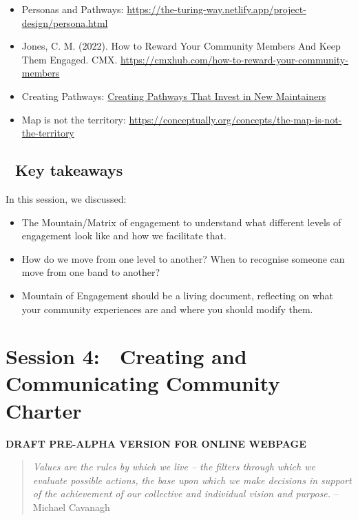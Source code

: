 \documentclass[
  letterpaper,
  DIV=11,
  numbers=noendperiod]{scrreport}
\providecommand{\tightlist}{%
  \setlength{\itemsep}{0pt}\setlength{\parskip}{0pt}}\usepackage{longtable,booktabs,array}
\begin{document}
\begin{itemize}
\tightlist
\item
  Personas and Pathways:
  \url{https://the-turing-way.netlify.app/project-design/persona.html}
\item
  Jones, C. M. (2022). How to Reward Your Community Members And Keep
  Them Engaged. CMX.
  \url{https://cmxhub.com/how-to-reward-your-community-members}
\item
  Creating Pathways:
  \href{https://medium.com/@abbycabs/creating-pathways-that-invest-in-new-maintainers-8ffb52e09681}{Creating
  Pathways That Invest in New Maintainers}
\item
  Map is not the territory:
  \url{https://conceptually.org/concepts/the-map-is-not-the-territory}
\end{itemize}

\hypertarget{key-takeaways-2}{%
\section{🏡 Key takeaways}\label{key-takeaways-2}}

In this session, we discussed:

\begin{itemize}
\tightlist
\item
  The Mountain/Matrix of engagement to understand what different levels
  of engagement look like and how we facilitate that.
\item
  How do we move from one level to another? When to recognise someone
  can move from one band to another?
\item
  Mountain of Engagement should be a living document, reflecting on what
  your community experiences are and where you should modify them.
\end{itemize}


\hypertarget{session-4-creating-and-communicating-community-charter}{%
\chapter{Session 4: 📜 Creating and Communicating Community
Charter}\label{session-4-creating-and-communicating-community-charter}}

\textbf{DRAFT PRE-ALPHA VERSION FOR ONLINE WEBPAGE}

\begin{quote}
\emph{Values are the rules by which we live -- the filters through which
we evaluate possible actions, the base upon which we make decisions in
support of the achievement of our collective and individual vision and
purpose.} -- Michael Cavanagh
\end{quote}
\end{document}
